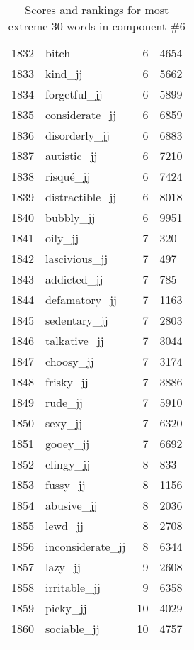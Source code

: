 \begin{longtable}[!htbp]{| rlr@{.}l |}
    1832 & bitch & 6 & 4654 \\
    1833 & kind\_jj & 6 & 5662 \\
    1834 & forgetful\_jj & 6 & 5899 \\
    1835 & considerate\_jj & 6 & 6859 \\
    1836 & disorderly\_jj & 6 & 6883 \\
    1837 & autistic\_jj & 6 & 7210 \\
    1838 & risqué\_jj & 6 & 7424 \\
    1839 & distractible\_jj & 6 & 8018 \\
    1840 & bubbly\_jj & 6 & 9951 \\
    1841 & oily\_jj & 7 & 320 \\
    1842 & lascivious\_jj & 7 & 497 \\
    1843 & addicted\_jj & 7 & 785 \\
    1844 & defamatory\_jj & 7 & 1163 \\
    1845 & sedentary\_jj & 7 & 2803 \\
    1846 & talkative\_jj & 7 & 3044 \\
    1847 & choosy\_jj & 7 & 3174 \\
    1848 & frisky\_jj & 7 & 3886 \\
    1849 & rude\_jj & 7 & 5910 \\
    1850 & sexy\_jj & 7 & 6320 \\
    1851 & gooey\_jj & 7 & 6692 \\
    1852 & clingy\_jj & 8 & 833 \\
    1853 & fussy\_jj & 8 & 1156 \\
    1854 & abusive\_jj & 8 & 2036 \\
    1855 & lewd\_jj & 8 & 2708 \\
    1856 & inconsiderate\_jj & 8 & 6344 \\
    1857 & lazy\_jj & 9 & 2608 \\
    1858 & irritable\_jj & 9 & 6358 \\
    1859 & picky\_jj & 10 & 4029 \\
    1860 & sociable\_jj & 10 & 4757 \\
    \hline
    \caption{Scores and rankings for most extreme 30 words in component \#6} \\
\end{longtable}
